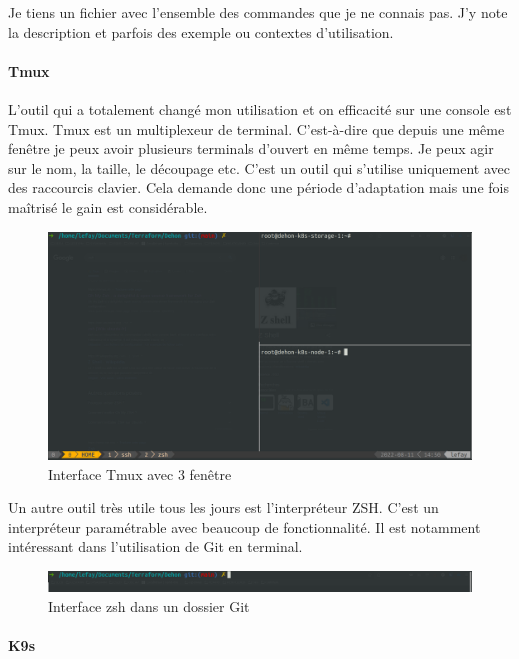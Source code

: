 \documentclass[12pt]{article}
\begin{document}
Je tiens un fichier avec l'ensemble des commandes que je ne connais pas.
J'y note la description et parfois des exemple ou contextes d'utilisation.


\paragraph{Tmux}
L'outil qui a totalement changé mon utilisation et on efficacité sur une console est Tmux.
Tmux est un multiplexeur de terminal.
C'est-à-dire que depuis une même fenêtre je peux avoir plusieurs terminals d'ouvert en même temps.
Je peux agir sur le nom, la taille, le découpage etc.
C'est un outil qui s'utilise uniquement avec des raccourcis clavier.
Cela demande donc une période d'adaptation mais une fois maîtrisé le gain est considérable.

\begin{figure}[!ht]
    \centering
        \includegraphics[width=\textwidth]{src/tmux.png}
    \caption{Interface Tmux avec 3 fenêtre}
    \label{fig:tmux}
\end{figure}

Un autre outil très utile tous les jours est l'interpréteur ZSH.
C'est un interpréteur paramétrable avec beaucoup de fonctionnalité.
Il est notamment intéressant dans l'utilisation de Git en terminal.

\begin{figure}[!ht]
    \centering
        \includegraphics[width=\textwidth]{src/zsh.png}
    \caption{Interface zsh dans un dossier Git}
    \label{fig:zsh}
\end{figure}

\newpage
\paragraph{K9s}
\end{document}
